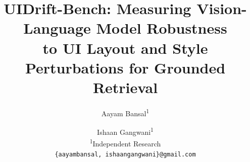 \documentclass[10pt,twocolumn,letterpaper]{article}
\begin{document}
\title{UIDrift-Bench: Measuring Vision-Language Model Robustness\\to UI Layout and Style Perturbations for Grounded Retrieval}
\author{Aayam Bansal\textsuperscript{1} \and Ishaan Gangwani\textsuperscript{1}\\
\textsuperscript{1}Independent Research\\
{\tt\small \{aayambansal, ishaangangwani\}@gmail.com}}

\maketitle







{\small


}
\end{document}
